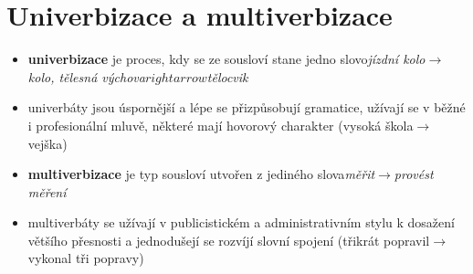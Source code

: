 \documentclass{memoir}
\begin{document}
\section*{Univerbizace a multiverbizace}
	\begin{itemize}
		\item \textbf{univerbizace} je proces, kdy se ze sousloví stane jedno slovo\hfill\textit{jízdní kolo$\rightarrow$kolo, tělesná výchova$rightarrow$tělocvik}
		\item univerbáty jsou úspornější a lépe se přizpůsobují gramatice, užívají se v běžné i profesionální mluvě, některé mají hovorový charakter (vysoká škola$\rightarrow$vejška)
		\item \textbf{multiverbizace} je typ sousloví utvořen z jediného slova\hfill\textit{měřit$\rightarrow$provést měření}
		\item multiverbáty se užívají v publicistickém a administrativním stylu k dosažení většího přesnosti a jednodušejí se rozvíjí slovní spojení (třikrát popravil$\rightarrow$vykonal tři popravy)
	\end{itemize}
	
\end{document}
